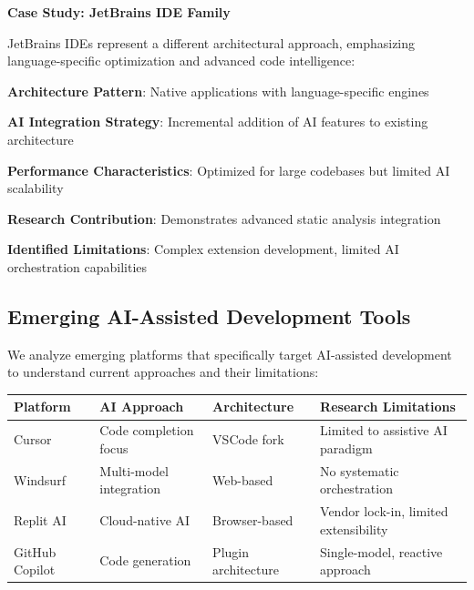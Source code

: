 \textbf{Case Study: JetBrains IDE Family}

JetBrains IDEs represent a different architectural approach, emphasizing language-specific optimization and advanced code intelligence:

\begin{compactlist}
    \item \textbf{Architecture Pattern}: Native applications with language-specific engines
    \item \textbf{AI Integration Strategy}: Incremental addition of AI features to existing architecture
    \item \textbf{Performance Characteristics}: Optimized for large codebases but limited AI scalability
    \item \textbf{Research Contribution}: Demonstrates advanced static analysis integration
    \item \textbf{Identified Limitations}: Complex extension development, limited AI orchestration capabilities
\end{compactlist}

\subsection{Emerging AI-Assisted Development Tools}
\label{subsec:ai-assisted-tools}

We analyze emerging platforms that specifically target AI-assisted development to understand current approaches and their limitations:

\begin{center}
\begin{tabular}{@{}p{3cm}p{2.5cm}p{2.5cm}p{4cm}@{}}
\toprule
\textbf{Platform} & \textbf{AI Approach} & \textbf{Architecture} & \textbf{Research Limitations} \\
\midrule
Cursor & Code completion focus & VSCode fork & Limited to assistive AI paradigm \\
Windsurf & Multi-model integration & Web-based & No systematic orchestration \\
Replit AI & Cloud-native AI & Browser-based & Vendor lock-in, limited extensibility \\
GitHub Copilot & Code generation & Plugin architecture & Single-model, reactive approach \\
\bottomrule
\end{tabular}
\label{tab:ai-assisted-platforms}
\end{center}


